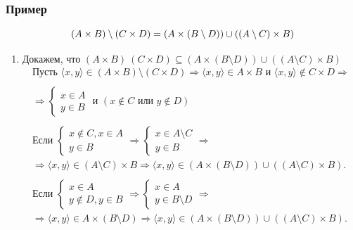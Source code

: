\documentclass{article}
\begin{document}
\subsubsection{Пример}
\[
    (A \times B) \setminus (C \times D) = (A \times (B \setminus D)) \cup ((A \setminus C) \times B) \\
\]
\begin{enumerate}
    \item Докажем, что $(A \times B) \ (C \times D) \subseteq (A \times (B \setminus D)) \cup ((A \setminus C) \times B)$
    \begin{gather*}
        \text{Пусть } \langle x, y \rangle \in (A \times B) \setminus (C \times D) \Rightarrow \langle x, y \rangle \in A \times B \text{ и } \langle x, y \rangle \notin C \times D \Rightarrow \\
        \\
        \Rightarrow \begin{cases}
            x \in A \\
            y \in B
        \end{cases} \text{ и } (x \notin C \text{ или } y \notin D) \\
        \\
        \text{Если } \begin{cases}
            x \notin C, x \in A \\
            y \in B
        \end{cases}
        \Rightarrow \begin{cases}
            x \in A \setminus C \\
            y \in B
        \end{cases} \Rightarrow \\
        \Rightarrow \langle x, y \rangle \in (A \setminus C) \times B \Rightarrow \langle x, y \rangle \in (A \times (B \setminus D)) \cup ((A \setminus C) \times B). \\
        \\
        \text{Если } \begin{cases}
            x \in A \\
            y \notin D, y \in B
        \end{cases}
        \Rightarrow \begin{cases}
            x \in A \\
            y \in B \setminus D
        \end{cases} \Rightarrow \\
        \Rightarrow \langle x, y \rangle \in A \times (B \setminus D) \Rightarrow \langle x, y \rangle \in (A \times (B \setminus D)) \cup ((A \setminus C) \times B). \\

\end{gather*}
\end{enumerate}
\end{document}
